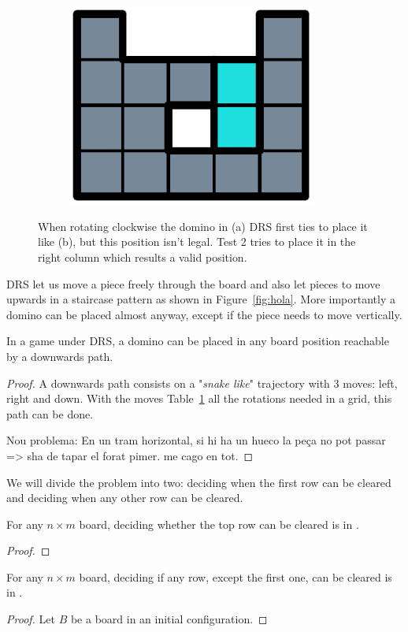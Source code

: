 \begin{figure}[ht]
\begin{subfigure}[b]{0.2\textwidth}
    \includegraphics[width=0.9\textwidth]{pictures/dominoes/drs-3.pdf}
    \caption{}
  \end{subfigure}
  \caption{When rotating clockwise the domino in (a) DRS first ties to place it like (b), but this position isn't legal. Test 2 tries to place it in the right column which results a valid position.}
  \label{dom:drs}
\end{figure}

DRS let us move a piece freely through the board and also let pieces to move upwards in a staircase pattern as shown in Figure~\ref{fig:hola}. More importantly a domino can be placed almost anyway, except if the piece needs to move vertically.

\begin{lemma0}
In a game under DRS, a domino can be placed in any board position reachable by a downwards path.
\end{lemma0}
\begin{proof}
  A downwards path consists on a "\emph{snake like}" trajectory with 3 moves: left, right and down. With the moves Table~\ref{dom:drs} all the rotations needed in a grid, this path can be done.

  Nou problema: En un tram horizontal, si hi ha un hueco la peça no pot passar => sha de tapar el forat pimer. me cago en tot.
\end{proof}

We will divide the problem into two: deciding when the first row can be cleared and deciding when any other row can be cleared.

\begin{lemma0}
For any $n \times m$ board, deciding whether the top row can be cleared is in \pp.
\end{lemma0}
\begin{proof}
\end{proof}

\begin{lemma0}
For any $n \times m$ board, deciding if any row, except the first one, can be cleared is in \pp.
\end{lemma0}

\begin{proof}
Let $B$ be a board in an initial configuration. 
\end{proof}
